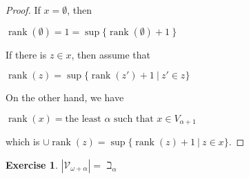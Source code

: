 \documentclass[8pt]{article}
\theoremstyle{definition}
\theoremstyle{definition}
\theoremstyle{definition}
\theoremstyle{definition}
\theoremstyle{definition}
\theoremstyle{definition}
\theoremstyle{definition}
\theoremstyle{definition}
\theoremstyle{definition}
\theoremstyle{definition}
\theoremstyle{definition}
\theoremstyle{definition}
\theoremstyle{definition}
\newtheorem{exercise}{Exercise}[section]
\theoremstyle{definition}
\theoremstyle{question}
\begin{document}
\begin{proof}
  If $x = \emptyset$, then 
  \begin{center}
    $\operatorname{rank}(\emptyset) = 1 = \sup \{ \operatorname{rank}(\emptyset) + 1 \: \}$
  \end{center}

  If there is $z \in x$, then assume that 
  \begin{center}
    $\operatorname{rank}(z) = \sup \{ \operatorname{rank}(z') + 1 \: | \: z' \in z \}$
  \end{center}

  On the other hand, we have
  \begin{center}
    $\operatorname{rank}(x) = \text{the least $\alpha$ such that $x \in V_{\alpha + 1}$}$
  \end{center}
  which is $\cup \operatorname{rank}(z) = \sup \{ \operatorname{rank}(z) + 1 \: | \: z \in x \}$.
\end{proof}

\begin{exercise}
  $|\mathcal{V}_{\omega + \alpha}| = \beth_{\alpha}$
\end{exercise}
\end{document}
